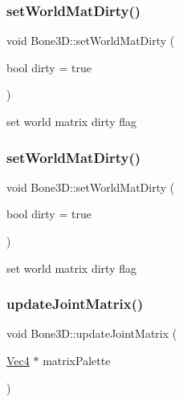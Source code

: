 \subsubsection{\texorpdfstring{set\+World\+Mat\+Dirty()}{setWorldMatDirty()}\hspace{0.1cm}{\footnotesize\ttfamily [1/2]}}
{\footnotesize\ttfamily void Bone3\+D\+::set\+World\+Mat\+Dirty (\begin{DoxyParamCaption}\item[{bool}]{dirty = {\ttfamily true} }\end{DoxyParamCaption})\hspace{0.3cm}{\ttfamily [protected]}}

set world matrix dirty flag \mbox{\label{classBone3D_a106b423193457bdc905e9a61d041d5d0}} 
\subsubsection{\texorpdfstring{set\+World\+Mat\+Dirty()}{setWorldMatDirty()}\hspace{0.1cm}{\footnotesize\ttfamily [2/2]}}
{\footnotesize\ttfamily void Bone3\+D\+::set\+World\+Mat\+Dirty (\begin{DoxyParamCaption}\item[{bool}]{dirty = {\ttfamily true} }\end{DoxyParamCaption})\hspace{0.3cm}{\ttfamily [protected]}}

set world matrix dirty flag \mbox{\label{classBone3D_aab877746976dc466bcc339845529b2e5}} 
\subsubsection{\texorpdfstring{update\+Joint\+Matrix()}{updateJointMatrix()}\hspace{0.1cm}{\footnotesize\ttfamily [1/2]}}
{\footnotesize\ttfamily void Bone3\+D\+::update\+Joint\+Matrix (\begin{DoxyParamCaption}\item[{\hyperlink{classVec4}{Vec4} $\ast$}]{matrix\+Palette }\end{DoxyParamCaption})}


